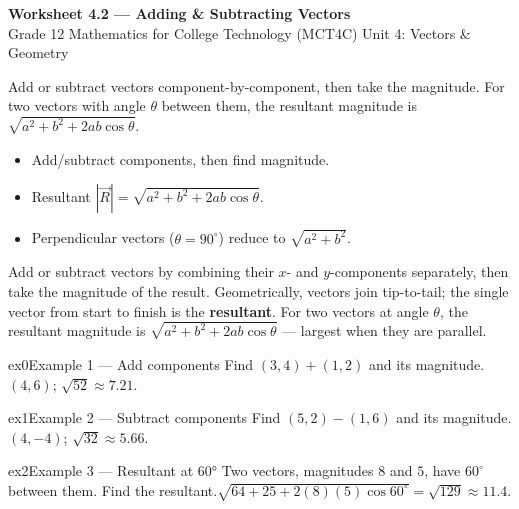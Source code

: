 \documentclass[11pt]{article}
\begin{document}
\begin{center}
{\LARGE\bfseries\color{titleblue}Worksheet 4.2 --- Adding \& Subtracting Vectors}\\[2pt]
{\small Grade 12 Mathematics for College Technology (MCT4C) \textperiodcentered{} Unit 4: Vectors \& Geometry}
\end{center}

\begin{ideabox}
Add or subtract vectors component-by-component, then take the magnitude. For two vectors with angle $\theta$ between them, the resultant magnitude is $\sqrt{a^2+b^2+2ab\cos\theta}$.
\begin{itemize}[leftmargin=*,itemsep=2pt]
  \item Add/subtract components, then find magnitude.
  \item Resultant $|\vec R|=\sqrt{a^2+b^2+2ab\cos\theta}$.
  \item Perpendicular vectors ($\theta=90^\circ$) reduce to $\sqrt{a^2+b^2}$.
\end{itemize}
\end{ideabox}

\begin{learnbox}
Add or subtract vectors by combining their $x$- and $y$-components separately, then take the magnitude of the result.
Geometrically, vectors join tip-to-tail; the single vector from start to finish is the \textbf{resultant}.
For two vectors at angle $\theta$, the resultant magnitude is $\sqrt{a^2+b^2+2ab\cos\theta}$ — largest when they are parallel.
\end{learnbox}


\begin{example}{ex0}{Example 1 --- Add components}
Find $(3,4)+(1,2)$ and its magnitude.\soln $(4,6)$; $\sqrt{52}\approx7.21$.
\end{example}

\begin{example}{ex1}{Example 2 --- Subtract components}
Find $(5,2)-(1,6)$ and its magnitude.\soln $(4,-4)$; $\sqrt{32}\approx5.66$.
\end{example}

\begin{example}{ex2}{Example 3 --- Resultant at 60°}
Two vectors, magnitudes $8$ and $5$, have $60^\circ$ between them. Find the resultant.\soln $\sqrt{64+25+2(8)(5)\cos60^\circ}=\sqrt{129}\approx11.4$.
\end{example}
\end{document}
